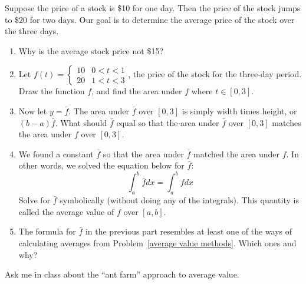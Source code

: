 \begin{problem}
 Suppose the price of a stock is \$10 for one day.  Then the price of the stock jumps to \$20 for two days.  Our goal is to determine the average price of the stock over the three days.
\begin{enumerate}
 \item Why is the average stock price not \$15?
 \item Let $f(t) = \begin{cases}10 &0<t<1\\20&1<t<3\end{cases}$, the price of the stock for the three-day period. Draw the function $f$, and find the area under $f$ where $t\in[0,3]$.
 \item Now let $y=\bar f$.  The area under $\bar f$ over $[0,3]$ is simply width times height, or $(b-a)\bar f$. What should $\bar f$ equal so that the area under $\bar f$ over $[0,3]$ matches the area under $f$ over $[0,3]$.
 \item We found a constant $\bar f$ so that the area under $\bar f$ matched the area under $f$. In other words, we solved the equation below for $\bar f$: 
$$\int_a^b \bar f dx = \int_a^b f dx$$
  Solve for $\bar f$ symbolically (without doing any of the integrals). This quantity is called the average value of $f$ over $[a,b]$.%
\item {}%
 The formula for $\bar f$ in the previous part resembles at least one of the ways of calculating averages from Problem~\ref{average value methods}.  Which ones and why?
\end{enumerate}
\end{problem}

%
Ask me in class about the ``ant farm'' approach to average value. 

